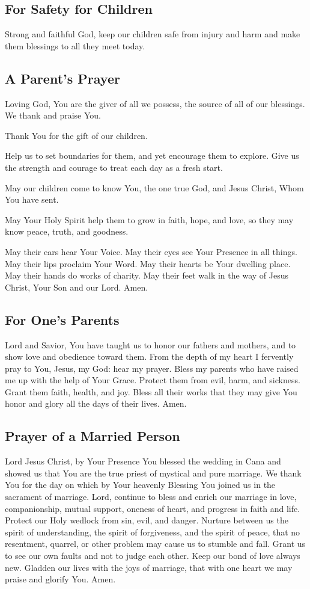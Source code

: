 \documentclass[12pt]{article}
\newcommand{\prayertitle}[1]{\subsection{#1}}
\begin{document}
\prayertitle{For Safety for Children}
\label{prayer:safety_children}
Strong and faithful God, keep our children safe from injury and harm and make them blessings to all they meet today.

\prayertitle{A Parent's Prayer}
\label{prayer:parent}
Loving God, You are the giver of all we possess, the source of all of our blessings.
We thank and praise You.

Thank You for the gift of our children.

Help us to set boundaries for them, and yet encourage them to explore.
Give us the strength and courage to treat each day as a fresh start.

May our children come to know You, the one true God, and Jesus Christ, Whom You have sent.

May Your Holy Spirit help them to grow in faith, hope, and love, so they may know peace, truth, and goodness.

May their ears hear Your Voice.
May their eyes see Your Presence in all things.
May their lips proclaim Your Word.
May their hearts be Your dwelling place.
May their hands do works of charity.
May their feet walk in the way of Jesus Christ, Your Son and our Lord.
Amen.

\prayertitle{For One's Parents}
Lord and Savior, You have taught us to honor our fathers and mothers, and to show love and obedience toward them.
From the depth of my heart I fervently pray to You, Jesus, my God: hear my prayer.
Bless my parents who have raised me up with the help of Your Grace.
Protect them from evil, harm, and sickness.
Grant them faith, health, and joy.
Bless all their works that they may give You honor and glory all the days of their lives.
Amen.

\prayertitle{Prayer of a Married Person}
Lord Jesus Christ, by Your Presence You blessed the wedding in Cana and showed us that You are the true priest of mystical and pure marriage.
We thank You for the day on which by Your heavenly Blessing You joined us in the sacrament of marriage.
Lord, continue to bless and enrich our marriage in love, companionship, mutual support, oneness of heart, and progress in faith and life.
Protect our Holy wedlock from sin, evil, and danger.
Nurture between us the spirit of understanding, the spirit of forgiveness, and the spirit of peace, that no resentment, quarrel, or other problem may cause us to stumble and fall.
Grant us to see our own faults and not to judge each other.
Keep our bond of love always new.
Gladden our lives with the joys of marriage, that with one heart we may praise and glorify You.
Amen.
\end{document}

